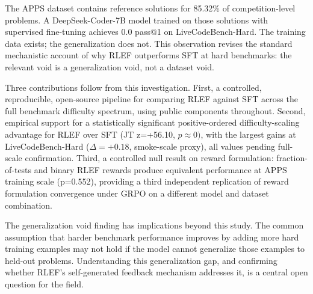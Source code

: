 
The APPS dataset contains reference solutions for 85.32\% of competition-level problems. A DeepSeek-Coder-7B model trained on those solutions with supervised fine-tuning achieves 0.0 pass@1 on LiveCodeBench-Hard. The training data exists; the generalization does not. This observation revises the standard mechanistic account of why RLEF outperforms SFT at hard benchmarks: the relevant void is a generalization void, not a dataset void.

Three contributions follow from this investigation. First, a controlled, reproducible, open-source pipeline for comparing RLEF against SFT across the full benchmark difficulty spectrum, using public components throughout. Second, empirical support for a statistically significant positive-ordered difficulty-scaling advantage for RLEF over SFT (JT z=+56.10, $p\approx 0)$, with the largest gains at LiveCodeBench-Hard ($\Delta =+0.18$, smoke-scale proxy), all values pending full-scale confirmation. Third, a controlled null result on reward formulation: fraction-of-tests and binary RLEF rewards produce equivalent performance at APPS training scale (p=0.552), providing a third independent replication of reward formulation convergence under GRPO on a different model and dataset combination.

The generalization void finding has implications beyond this study. The common assumption that harder benchmark performance improves by adding more hard training examples may not hold if the model cannot generalize those examples to held-out problems. Understanding this generalization gap, and confirming whether RLEF's self-generated feedback mechanism addresses it, is a central open question for the field.

